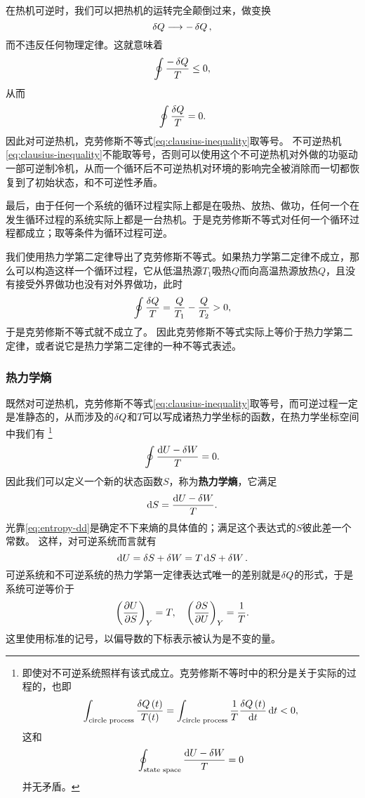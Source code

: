 \documentclass[hyperref, UTF8, a4paper]{ctexart}
\begin{document}
在热机可逆时，我们可以把热机的运转完全颠倒过来，做变换
\[
    \var{Q} \longrightarrow -\var{Q},
\]
而不违反任何物理定律。这就意味着
\[
    \oint \frac{-\var{Q}}{T} \leq 0,
\]
从而
\[
    \oint \frac{\var{Q}}{T} = 0.
\]
因此对可逆热机，克劳修斯不等式\eqref{eq:clausius-inequality}取等号。
不可逆热机\eqref{eq:clausius-inequality}不能取等号，否则可以使用这个不可逆热机对外做的功驱动一部可逆制冷机，从而一个循环后不可逆热机对环境的影响完全被消除而一切都恢复到了初始状态，和不可逆性矛盾。


最后，由于任何一个系统的循环过程实际上都是在吸热、放热、做功，任何一个在发生循环过程的系统实际上都是一台热机。于是克劳修斯不等式对任何一个循环过程都成立；取等条件为循环过程可逆。

我们使用热力学第二定律导出了克劳修斯不等式。如果热力学第二定律不成立，那么可以构造这样一个循环过程，它从低温热源$T_1$吸热$Q$而向高温热源放热$Q$，且没有接受外界做功也没有对外界做功，此时
\[
    \oint \frac{\var{Q}}{T} = \frac{Q}{T_1} - \frac{Q}{T_2} > 0,
\]
于是克劳修斯不等式就不成立了。
因此克劳修斯不等式实际上等价于热力学第二定律，或者说它是热力学第二定律的一种不等式表述。

\subsubsection{热力学熵}

既然对可逆热机，克劳修斯不等式\eqref{eq:clausius-inequality}取等号，而可逆过程一定是准静态的，从而涉及的$\var{Q}$和$T$可以写成诸热力学坐标的函数，在热力学坐标空间中我们有%
\footnote{即使对不可逆系统照样有该式成立。克劳修斯不等时中的积分是关于实际的过程的，也即
\[
    \int_\text{circle process} \frac{\var{Q}(t)}{T(t)} = \int_\text{circle process} \frac{1}{T} \frac{\var{Q}(t)}{\dd{t}} \dd{t} < 0,
\]
这和
\[
    \oint_\text{state space} \frac{\dd{U}-\var{W}}{T} = 0
\]
并无矛盾。}
\begin{equation}
    \oint \frac{\dd{U}-\var{W}}{T} = 0.
\end{equation}
因此我们可以定义一个新的状态函数$S$，称为\textbf{热力学熵}，它满足
\begin{equation}
    \dd{S} = \frac{\dd{U}-\var{W}}{T}.
    \label{eq:entropy-dd}
\end{equation}
光靠\eqref{eq:entropy-dd}是确定不下来熵的具体值的；满足这个表达式的$S$彼此差一个常数。
这样，对可逆系统而言就有
\begin{equation}
    \dd{U} = \var{S} + \var{W} = T\dd{S} + \var{W}.
\end{equation}
可逆系统和不可逆系统的热力学第一定律表达式唯一的差别就是$\var{Q}$的形式，于是系统可逆等价于
\begin{equation}
    \left(\pdv{U}{S}\right)_{Y} = T, \quad \left(\pdv{S}{U}\right)_Y = \frac{1}{T}.
    \label{eq:pdv-of-u-and-s}
\end{equation}
这里使用标准的记号，以偏导数的下标表示被认为是不变的量。
\end{document}
